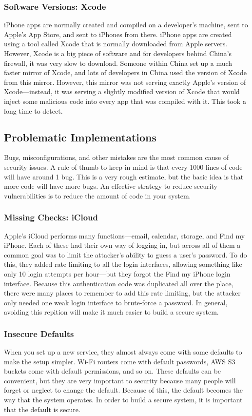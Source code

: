 \subsubsection{Software Versions: Xcode}
iPhone apps are normally created and compiled on a developer's machine, sent to Apple's App Store, and sent to iPhones from there. iPhone apps are created using a tool called Xcode that is normally downloaded from Apple servers. However, Xcode is a big piece of software and for developers behind China's firewall, it was very slow to download. Someone within China set up a much faster mirror of Xcode, and lots of developers in China used the version of Xcode from this mirror. However, this mirror was not serving exactly Apple's version of Xcode---instead, it was serving a slightly modified version of Xcode that would inject some malicious code into every app that was compiled with it. This took a long time to detect. 

\subsection{Problematic Implementations}
Bugs, misconfigurations, and other mistakes are the most common cause of security issues. A rule of thumb to keep in mind is that every 1000 lines of code will have around 1 bug. This is a very rough estimate, but the basic idea is that more code will have more bugs. An effective strategy to reduce security vulnerabilities is to reduce the amount of code in your system.

\subsubsection{Missing Checks: iCloud}
Apple's iCloud performs many functions---email, calendar, storage, and Find my iPhone. Each of these had their own way of logging in, but across all of them a common goal was to limit the attacker's ability to guess a user's password. To do this, they added rate limiting to all the login interfaces, allowing something like only 10 login attempts per hour---but they forgot the Find my iPhone login interface. Because this authentication code was duplicated all over the place, there were many places to remember to add this rate limiting, but the attacker only needed one weak login interface to brute-force a password. In general, avoiding this repition will make it much easier to build a secure system.

\subsubsection{Insecure Defaults}
When you set up a new service, they almost always come with some defaults to make the setup simpler. Wi-Fi routers come with default passwords, AWS S3 buckets come with default permissions, and so on. These defaults can be convenient, but they are very important to security because many people will forget or neglect to change the default. Because of this, the default becomes the way that the system operates. In order to build a secure system, it is important that the default is secure.



